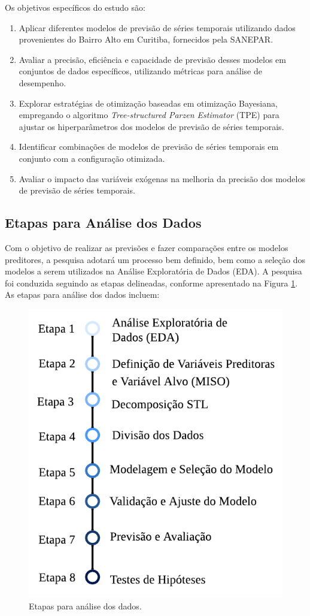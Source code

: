 Os objetivos específicos do estudo são:
\begin{enumerate}
	
	\item Aplicar diferentes modelos de previsão de séries temporais utilizando dados provenientes do Bairro Alto em Curitiba, fornecidos pela SANEPAR.
	
	\item Avaliar a precisão, eficiência e capacidade de previsão desses modelos em conjuntos de dados específicos, utilizando métricas para análise de desempenho.
	
	\item Explorar estratégias de otimização baseadas em otimização Bayesiana, empregando o algoritmo \textit{Tree-structured Parzen Estimator} (TPE) para ajustar os hiperparâmetros dos modelos de previsão de séries temporais.
	
	\item Identificar combinações de modelos de previsão de séries temporais em conjunto com a configuração otimizada. 
	
	\item Avaliar o impacto das variáveis exógenas na melhoria da precisão dos modelos de previsão de séries temporais.
	
\end{enumerate}

\subsection{Etapas para An\'alise dos Dados} 
\label{subsec:metod}

Com o objetivo de realizar as previsões e fazer comparações entre os modelos preditores, a pesquisa adotará um processo bem definido, bem como a seleção dos modelos a serem utilizados na Análise Exploratória de Dados (EDA). A pesquisa foi conduzida seguindo as etapas delineadas, conforme apresentado na Figura \ref{fig:etapas}.
As etapas para análise dos dados incluem:

\begin{figure}[!htb]
	\centering
	\caption{Etapas para análise dos dados.}
	\label{fig:etapas}
	\includegraphics[width=0.7\linewidth]{Introducao/Figuras/Etapas}
\end{figure}


